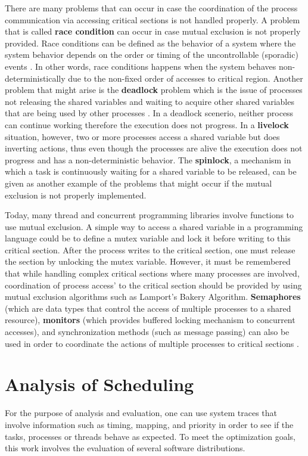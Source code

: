 There are many problems that can occur in case the coordination of the process communication via accessing critical sections is not handled properly. A problem that is called \textbf{race condition} can occur in case mutual exclusion is not properly provided. Race conditions can be defined as the behavior of a system where the system behavior depends on the order or timing of the uncontrollable (sporadic) events \cite{lukas1}. In other words, race conditions happens when the system behaves non-deterministically due to the non-fixed order of accesses to critical region. Another problem that might arise is the \textbf{deadlock} problem which is the issue of processes not releasing the shared variables and waiting to acquire other shared variables that are being used by other processes \cite{lukas1}. In a deadlock scenerio, neither process can continue working therefore the execution does not progress. In a \textbf{livelock} situation, however, two or more processes access a shared variable but does inverting actions, thus even though the processes are alive the execution does not progress and has a non-deterministic behavior. The \textbf{spinlock}, a mechanism in which a task is continuously waiting for a shared variable to be released, can be given as another example of the problems that might occur if the mutual exclusion is not properly implemented.

Today, many thread and concurrent programming libraries involve functions to use mutual exclusion. A simple way to access a shared variable in a programming language could be to define a mutex variable and lock it before writing to this critical section. After the process writes to the critical section, one must release the section by unlocking the mutex variable. However, it must be remembered that while handling complex critical sections where many processes are involved, coordination of process access' to the critical section should be provided by using mutual exclusion algorithms such as Lamport's Bakery Algorithm. \textbf{Semaphores}  (which are data types that control the access of multiple processes to a shared resource), \textbf{monitors} (which provides buffered locking mechanism to concurrent accesses), and synchronization methods (such as message passing) can also be used in order to coordinate the actions of multiple processes to critical sections \cite{lukas1}\cite{springerparallel}.

\section{Analysis of Scheduling}\label{schedulingsection}%
For the purpose of analysis and evaluation, one can use system traces that involve information such as timing, mapping, and priority in order to see if the tasks, processes or threads behave as expected. To meet the optimization goals, this work involves the evaluation of several software distributions. 

